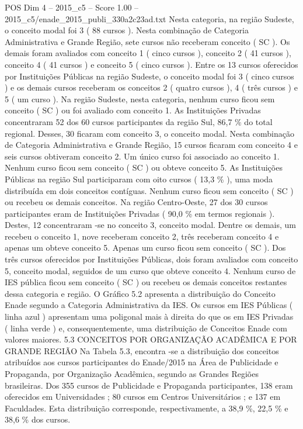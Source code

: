\begin{textsample}{POS Dim 4 – 2015\_c5 – Score 1.00 – 2015\_c5/enade\_2015\_publi\_330a2c23ad.txt}
Nesta categoria, na região Sudeste, o conceito modal foi 3 ( 88 cursos ).
Nesta combinação de Categoria Administrativa e Grande Região, sete cursos não receberam conceito ( SC ).
Os demais foram avaliados com conceito 1 ( cinco cursos ), conceito 2 ( 41 cursos ), conceito 4 ( 41 cursos ) e conceito 5 ( cinco cursos ).
Entre os 13 cursos oferecidos por Instituições Públicas na região Sudeste, o conceito modal foi 3 ( cinco cursos ) e os demais cursos receberam os conceitos 2 ( quatro cursos ), 4 ( três cursos ) e 5 ( um curso ).
Na região Sudeste, nesta categoria, nenhum curso ficou sem conceito ( SC ) ou foi avaliado com conceito 1.
As Instituições Privadas concentraram 52 dos 60 cursos participantes da região Sul, 86,7 \% do total regional.
Desses, 30 ficaram com conceito 3, o conceito modal.
Nesta combinação de Categoria Administrativa e Grande Região, 15 cursos ficaram com conceito 4 e seis cursos obtiveram conceito 2.
Um único curso foi associado ao conceito 1.
Nenhum curso ficou sem conceito ( SC ) ou obteve conceito 5.
As Instituições Públicas na região Sul participaram com oito cursos ( 13,3 \% ), uma moda distribuída em dois conceitos contíguas.
Nenhum curso ficou sem conceito ( SC ) ou recebeu os demais conceitos.
Na região Centro-Oeste, 27 dos 30 cursos participantes eram de Instituições Privadas ( 90,0 \% em termos regionais ).
Destes, 12 concentraram -se no conceito 3, conceito modal.
Dentre os demais, um recebeu o conceito 1, nove receberam conceito 2, três receberam conceito 4 e apenas um obteve conceito 5.
Apenas um curso ficou sem conceito ( SC ).
Dos três cursos oferecidos por Instituições Públicas, dois foram avaliados com conceito 5, conceito modal, seguidos de um curso que obteve conceito 4.
Nenhum curso de IES pública ficou sem conceito ( SC ) ou recebeu os demais conceitos restantes dessa categoria e região.
O Gráfico 5.2 apresenta a distribuição do Conceito Enade segundo a Categoria Administrativa da IES.
Os cursos em IES Públicas ( linha azul ) apresentam uma poligonal mais à direita do que os em IES Privadas ( linha verde ) e, consequentemente, uma distribuição de Conceitos Enade com valores maiores. 5.3 CONCEITOS POR ORGANIZAÇÃO ACADÊMICA E POR GRANDE REGIÃO Na Tabela 5.3, encontra -se a distribuição dos conceitos atribuídos aos cursos participantes do Enade/2015 na Área de Publicidade e Propaganda, por Organização Acadêmica, segundo as Grandes Regiões brasileiras.
Dos 355 cursos de Publicidade e Propaganda participantes, 138 eram oferecidos em Universidades ; 80 cursos em Centros Universitários ; e 137 em Faculdades.
Esta distribuição corresponde, respectivamente, a 38,9 \%, 22,5 \% e 38,6 \% dos cursos.

\end{textsample}
